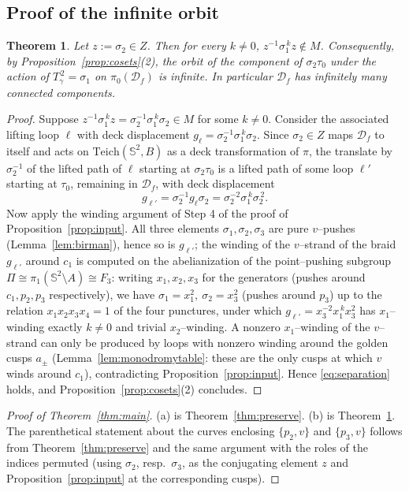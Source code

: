\documentclass[11pt]{amsart}
\theoremstyle{plain}
\newtheorem{theorem}{Theorem}[section]
\theoremstyle{definition}
\newcommand{\Sph}{\mathbb{S}^2}
\newcommand{\Teich}{\mathrm{Teich}}
\newcommand{\D}{\mathcal{D}}
\begin{document}
\subsection{Proof of the infinite orbit}

\begin{theorem}\label{thm:infinite}
Let $z:=\sigma_2\in Z$.  Then for every $k\ne0$,
$z^{-1}\sigma_1^{\,k}z\notin M$.  Consequently, by
Proposition~\ref{prop:cosets}(2), the orbit of the component of
$\sigma_2\tau_0$ under the action of $T_\gamma^{\,2}=\sigma_1$ on
$\pi_0(\D_f)$ is infinite.  In particular $\D_f$ has infinitely many
connected components.
\end{theorem}

\begin{proof}
Suppose $z^{-1}\sigma_1^{\,k}z=\sigma_2^{-1}\sigma_1^{\,k}\sigma_2\in M$
for some $k\ne0$.  Consider the associated lifting loop $\ell$ with deck
displacement $g_\ell=\sigma_2^{-1}\sigma_1^{\,k}\sigma_2$.  Since
$\sigma_2\in Z$ maps $\D_f$ to itself and acts on $\Teich(\Sph,B)$ as a
deck transformation of $\pi$, the translate by $\sigma_2^{-1}$ of the
lifted path of $\ell$ starting at $\sigma_2\tau_0$ is a lifted path of
some loop $\ell'$ starting at $\tau_0$, remaining in $\D_f$, with deck
displacement
$$g_{\ell'}=\sigma_2^{-1}g_\ell\sigma_2
=\sigma_2^{-2}\sigma_1^{\,k}\sigma_2^{\,2}.$$
Now apply the winding argument of Step 4 of the proof of
Proposition~\ref{prop:input}.  All three elements $\sigma_1,\sigma_2,
\sigma_3$ are pure $v$--pushes (Lemma~\ref{lem:birman}), hence so is
$g_{\ell'}$; the winding of the $v$--strand of the braid $g_{\ell'}$ around
$c_1$ is computed on the abelianization of the point--pushing subgroup
$\Pi\cong\pi_1(\Sph\setminus A)\cong F_3$: writing $x_1,x_2,x_3$ for the
generators (pushes around $c_1,p_2,p_3$ respectively), we have
$\sigma_1=x_1^{2},\ \sigma_2=x_3^{2}$ (pushes around $p_3$) up to the
relation $x_1x_2x_3x_4=1$ of the four punctures, under which
$g_{\ell'}=x_3^{-2}x_1^{\,k}x_3^{2}$ has $x_1$--winding exactly $k\neq0$
and trivial $x_2$--winding.  A nonzero $x_1$--winding of the $v$--strand
can only be produced by loops with nonzero winding around the golden
cusps $a_\pm$ (Lemma~\ref{lem:monodromytable}: these are the only cusps at
which $v$ winds around $c_1$), contradicting
Proposition~\ref{prop:input}.  Hence \eqref{eq:separation} holds, and
Proposition~\ref{prop:cosets}(2) concludes.
\end{proof}

\begin{proof}[Proof of Theorem~\ref{thm:main}]
(a) is Theorem~\ref{thm:preserve}.  (b) is
Theorem~\ref{thm:infinite}.  The parenthetical statement about the curves
enclosing $\{p_2,v\}$ and $\{p_3,v\}$ follows from
Theorem~\ref{thm:preserve} and the same argument with the roles of the
indices permuted (using $\sigma_2$, resp.\ $\sigma_3$, as the conjugating
element $z$ and Proposition~\ref{prop:input} at the corresponding cusps).
\end{proof}
\end{document}
